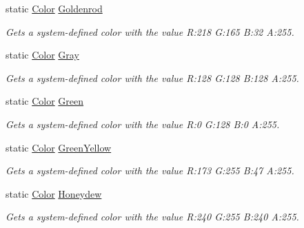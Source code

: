 \begin{DoxyCompactItemize}
static \hyperlink{struct_microsoft_1_1_xna_1_1_framework_1_1_color}{Color} \hyperlink{struct_microsoft_1_1_xna_1_1_framework_1_1_color_a5d2e9b1b83269946e57ce840ebc2dd30}{Goldenrod}
\begin{DoxyCompactList}\small\item\em Gets a system-\/defined color with the value R\+:218 G\+:165 B\+:32 A\+:255.\end{DoxyCompactList}\item 
static \hyperlink{struct_microsoft_1_1_xna_1_1_framework_1_1_color}{Color} \hyperlink{struct_microsoft_1_1_xna_1_1_framework_1_1_color_ae5d0877962ff9a4291bb15929200bfea}{Gray}
\begin{DoxyCompactList}\small\item\em Gets a system-\/defined color with the value R\+:128 G\+:128 B\+:128 A\+:255.\end{DoxyCompactList}\item 
static \hyperlink{struct_microsoft_1_1_xna_1_1_framework_1_1_color}{Color} \hyperlink{struct_microsoft_1_1_xna_1_1_framework_1_1_color_a10be5216ccd44b7074cf42e2fd55771b}{Green}
\begin{DoxyCompactList}\small\item\em Gets a system-\/defined color with the value R\+:0 G\+:128 B\+:0 A\+:255.\end{DoxyCompactList}\item 
static \hyperlink{struct_microsoft_1_1_xna_1_1_framework_1_1_color}{Color} \hyperlink{struct_microsoft_1_1_xna_1_1_framework_1_1_color_a3db57006284571a2aa4656749a70f852}{Green\+Yellow}
\begin{DoxyCompactList}\small\item\em Gets a system-\/defined color with the value R\+:173 G\+:255 B\+:47 A\+:255.\end{DoxyCompactList}\item 
static \hyperlink{struct_microsoft_1_1_xna_1_1_framework_1_1_color}{Color} \hyperlink{struct_microsoft_1_1_xna_1_1_framework_1_1_color_a6dcb4365bf25d4ccbffc7c378b11a453}{Honeydew}
\begin{DoxyCompactList}\small\item\em Gets a system-\/defined color with the value R\+:240 G\+:255 B\+:240 A\+:255.\end{DoxyCompactList}\item 

\end{DoxyCompactItemize}
